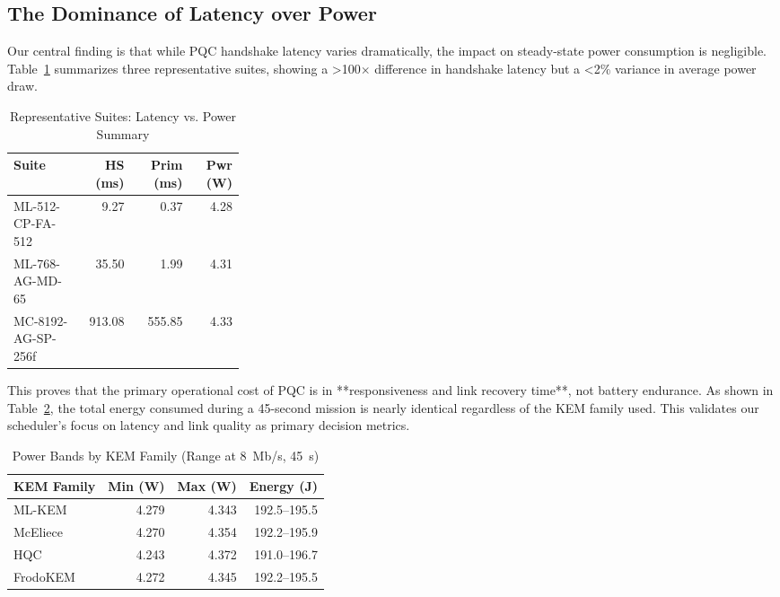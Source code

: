 \documentclass[sigconf,natbib=false]{acmart}
\begin{document}
\subsection{The Dominance of Latency over Power}

Our central finding is that while PQC handshake latency varies dramatically, the impact on steady-state power consumption is negligible. Table~\ref{tab:rep_suites} summarizes three representative suites, showing a >100$\times$ difference in handshake latency but a <2\% variance in average power draw.

\begin{table}[ht]
\centering
\caption{Representative Suites: Latency vs. Power Summary}
\label{tab:rep_suites}
\begingroup
\small
\setlength{\tabcolsep}{3pt}
\begin{tabular}{@{}p{0.30\linewidth}rrr@{}}
\toprule
\textbf{Suite} & \textbf{HS (ms)} & \textbf{Prim (ms)} & \textbf{Pwr (W)} \\
\midrule
ML-512-CP-FA-512 & 9.27 & 0.37 & 4.28 \\
ML-768-AG-MD-65 & 35.50 & 1.99 & 4.31 \\
MC-8192-AG-SP-256f & 913.08 & 555.85 & 4.33 \\
\bottomrule
\end{tabular}
\endgroup
\end{table}

This proves that the primary operational cost of PQC is in **responsiveness and link recovery time**, not battery endurance. As shown in Table~\ref{tab:powerbands}, the total energy consumed during a 45-second mission is nearly identical regardless of the KEM family used. This validates our scheduler's focus on latency and link quality as primary decision metrics.

\begin{table}[ht]
\centering
\caption{Power Bands by KEM Family (Range at 8~Mb/s, 45~s)}
\label{tab:powerbands}
\begingroup
\small
\setlength{\tabcolsep}{4pt}
\begin{tabular}{@{}lrrr@{}}
\toprule
\textbf{KEM Family} & \textbf{Min (W)} & \textbf{Max (W)} & \textbf{Energy (J)} \\
\midrule
ML-KEM & 4.279 & 4.343 & 192.5--195.5 \\
McEliece & 4.270 & 4.354 & 192.2--195.9 \\
HQC & 4.243 & 4.372 & 191.0--196.7 \\
FrodoKEM & 4.272 & 4.345 & 192.2--195.5 \\
\bottomrule
\end{tabular}
\endgroup
\end{table}
\end{document}
